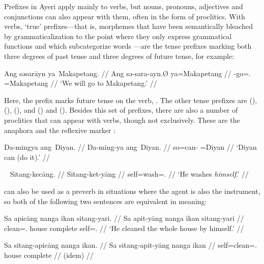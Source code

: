 Prefixes in Ayeri apply mainly to verbs, but nouns, pronouns, adjectives and 
conjunctions can also appear with them, often in the form of 
proclitics. With verbs, `true' prefixes---that is, morphemes that 
have been semantically bleached by grammaticalization to the point where they 
only express grammatical functions \citep[157ff.]{lehmann2015} and which 
subcategorize words \citep[117]{klavans1985}---are the tense prefixes marking 
both three degrees of past tense and three degrees of future tense, for example:

\ex\begingl
	\gla Ang səsarāyn ya~Makapetang. //
	\glb Ang sə-sara-ayn.Ø ya=Makapetang //
	\glc \AgtT{} \Fut{}-go=\Fpl{}.\Top{} \Loc{}=Makapetang //
	\glft `We will go to Makapetang.' //
\endgl\xe

Here, the prefix  marks future tense on the verb, 
. The other tense prefixes are  
(\NPst{}),  (\Pst{}),  (\RPst{}), and  
(\NFut{}) and  (\RFut{}). Besides this set of prefixes, there are 
also a number of proclitics that can appear with verbs, though not exclusively. 
These are the anaphora  and the 
reflexive marker :

\ex\begingl
	\gla Da-mingya ang~Diyan. //
	\glb Da-ming-ya ang~Diyan. //
	\glc so=can-\TsgM{} \Aarg{}=Diyan //
	\glft `Diyan can (do it).' //
\endgl
% 
\xe

\ex~\begingl
	\gla Sitang-kecāng. //
	\glb Sitang-ket-yāng //
	\glc self=wash=\TsgM{}.\Aarg{} //
	\glft `He washes \emph{himself}.' //
\endgl\xe

 can also be used as a preverb in situations where the 
agent is also the instrument, so both of the following two sentences are 
equivalent in meaning:

\pex
\a\label{ex:sitang+pronoun}\begingl
	\gla Sa apicāng nanga ikan sitang-yari. //
	\glb Sa apit-yāng nanga ikan sitang-yari //
	\glc \PatT{} clean=\Tsg{}.\Aarg{} house complete self=\TsgM{}.\Ins{} //
	\glft `He cleaned the whole house by himself.' //
\endgl

\a\begingl
	\gla Sa sitang-apicāng nanga ikan. //
	\glb Sa sitang-apit-yāng nanga ikan //
	\glc \PatT{} self=clean=\Tsg{}.\Aarg{} house complete //
	\glft (idem) //
\endgl
\xe

